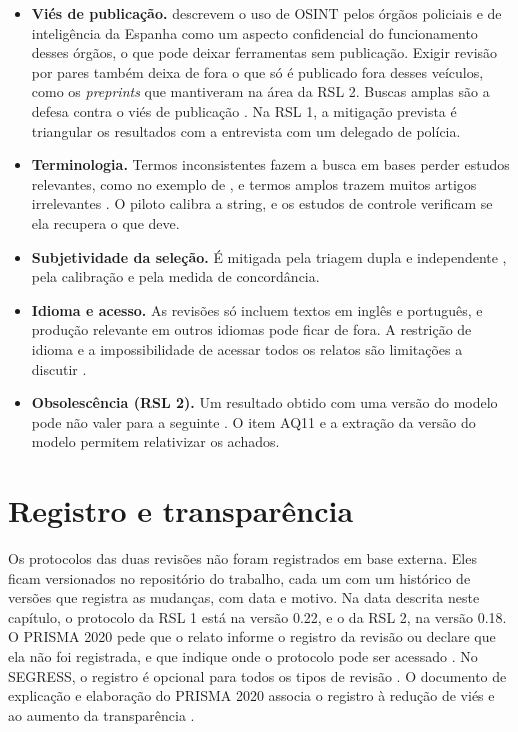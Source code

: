 \begin{itemize}
	\item \textbf{Viés de publicação.} 
	descrevem o uso de OSINT pelos órgãos policiais e de inteligência da
	Espanha como um
	aspecto confidencial do funcionamento desses órgãos, o que pode deixar
	ferramentas sem publicação. Exigir revisão por pares também deixa de fora
	o que só é publicado fora desses veículos, como os \textit{preprints} que
	 mantiveram na área da RSL 2. Buscas amplas
	são a defesa contra o viés de publicação
	\cite[seção 2.2]{kitchenham2023segress}. Na RSL 1, a mitigação prevista é
	triangular os resultados com a entrevista com um delegado de polícia.
	\item \textbf{Terminologia.} Termos inconsistentes fazem a busca em bases
	perder estudos relevantes, como no exemplo de , e termos amplos trazem muitos artigos irrelevantes
	\cite[seção 2]{wohlin2014}. O piloto calibra a string, e os estudos de
	controle verificam se ela recupera o que deve.
	\item \textbf{Subjetividade da seleção.} É mitigada pela triagem dupla e
	independente \cite[seção 2.2]{kitchenham2023segress}, pela calibração e
	pela medida de concordância.
	\item \textbf{Idioma e acesso.} As revisões só incluem textos em inglês e
	português, e produção relevante em outros idiomas pode ficar de fora. A
	restrição de idioma e a impossibilidade de acessar todos os relatos são
	limitações a discutir \cite[item 23c]{page2021ee}.
	\item \textbf{Obsolescência (RSL 2).} Um resultado obtido com uma versão do
	modelo pode não valer para a seguinte \cite{chen2024}. O item AQ11 e a
	extração da versão do modelo permitem relativizar os achados.
\end{itemize}

\section{Registro e transparência}
\label{sec:metodologia-registro}

Os protocolos das duas revisões não foram registrados em base externa. Eles
ficam versionados no repositório do trabalho, cada um com um histórico de
versões que registra as mudanças, com data e motivo. Na data descrita neste
capítulo, o protocolo da RSL 1 está na versão 0.22, e o da RSL 2, na versão
0.18. O PRISMA 2020 pede que o relato informe o registro da revisão ou declare
que ela não foi registrada, e que indique onde o protocolo pode ser acessado
\cite[itens 24a e 24b]{page2021prisma}. No SEGRESS, o registro é opcional para
todos os tipos de revisão \cite[item 24a]{kitchenham2023segress}. O documento
de explicação e elaboração do PRISMA 2020 associa o registro à redução de viés
e ao aumento da transparência \cite[item 24a, quadro 6]{page2021ee}.

